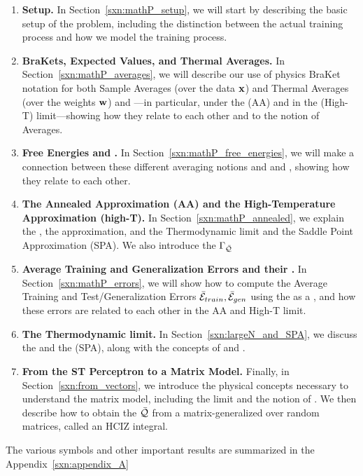 \begin{enumerate}[label=4.2.\arabic*]
\item
  \textbf{Setup.}
  In Section~\ref{sxn:mathP_setup}, 
we will start by describing the basic setup of the problem, including the distinction between the actual training process and how we model the training process.

 \item
 \textbf{BraKets, Expected Values, and Thermal Averages.}
In Section~\ref{sxn:mathP_averages}, 
we will describe our use of physics BraKet notation for both Sample Averages (over the data ${\mathbf{x}}$) and Thermal Averages (over the weights ${\mathbf{w}}$) and ---in particular, under the \AnnealedApproximation (AA) and in the \HighTemperature (High-T) limit---showing how they relate to each other and to the notion of \Replica Averages.
%
\item
  \textbf{Free Energies and \GeneratingFunctions.} 
In Section~\ref{sxn:mathP_free_energies}, 
we will make a connection between these different averaging notions and \FreeEnergies and \GeneratingFunctions, showing how they relate to each other.
%

\item
  \textbf{The Annealed Approximation (AA) and the High-Temperature Approximation (high-T).}
  In Section~\ref{sxn:mathP_annealed}, we explain the \AnnealedApproximation, the \HighTemperature approximation,
  and the Thermodynamic \LargeN limit and the Saddle Point Approximation (SPA).
  We also introduce the \Quality \GeneratingFunction $\Gamma_{\bar{\mathcal{Q}}}$%
  \item
    \textbf{Average Training and Generalization Errors and their \GeneratingFunctions.}
  In Section~\ref{sxn:mathP_errors}, we will show how to compute the Average Training and Test/Generalization Errors $\bar{\mathcal{E}}_{train}, \bar{\mathcal{E}}_{gen}$
using the \FreeEnergy as a \GeneratingFunction, and how these errors are related to each other in the AA and High-T limit. 
%
\item 
  \textbf{The Thermodynamic limit.}
  In Section~\ref{sxn:largeN_and_SPA}, we discuss the \LargeN \ThermodynamicLimit and the \SaddlePointApproximation (SPA),
  along with the concepts of \SelfAveraging and \WickRotations.
%
\item 
  \textbf{From the ST Perceptron to a Matrix Model.} 
  Finally, in Section~\ref{sxn:from_vectors}, we introduce the physical concepts necessary to understand the \SETOL matrix model, including the \WideLayer \LargeN limit and the notion of \SizeConsistency.  We  then describe how to obtain the \LayerQuality $\bar{\mathcal{Q}}$ from a matrix-generalized \ThermalAverage over random matrices, called an HCIZ integral.
\end{enumerate}
The various symbols and other important results are summarized in the Appendix~\ref{sxn:appendix_A}


